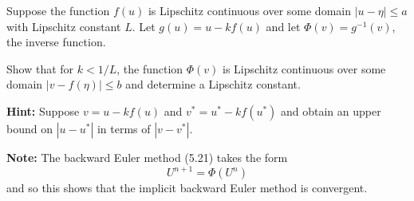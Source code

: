 

Suppose the function $f(u)$ is Lipschitz continuous over some domain
$|u-\eta|\leq a$ with Lipschitz constant $L$.
Let $g(u) = u - kf(u)$ and let $\Phi(v) = g^{-1}(v)$, the inverse function. 

Show that for $k<1/L$, the function $\Phi(v)$ is Lipschitz continuous
over some domain $|v-f(\eta)| \leq b$ and determine a Lipschitz constant.  

{\bf Hint:} Suppose $v =  u - kf(u)$ and $v^* = u^* - kf(u^*)$ and 
obtain an upper bound on $|u-u^*|$ in terms of $|v-v^*|$.

{\bf Note:} The backward Euler method (5.21) takes the form
\[
U^{n+1} = \Phi(U^n)
\]
and so this shows that the implicit backward Euler method is convergent.

